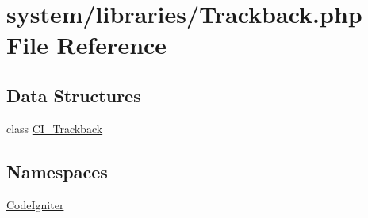 \hypertarget{_trackback_8php}{}\section{system/libraries/\+Trackback.php File Reference}
\label{_trackback_8php}
\subsection*{Data Structures}
\begin{DoxyCompactItemize}
\item 
class \mbox{\hyperlink{class_c_i___trackback}{C\+I\+\_\+\+Trackback}}
\end{DoxyCompactItemize}
\subsection*{Namespaces}
\begin{DoxyCompactItemize}
\item 
 \mbox{\hyperlink{namespace_code_igniter}{Code\+Igniter}}
\end{DoxyCompactItemize}
